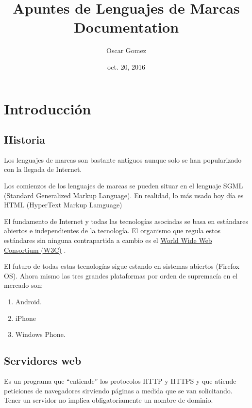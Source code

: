 \documentclass[letterpaper,10pt,spanish]{sphinxmanual}
\title{Apuntes de Lenguajes de Marcas Documentation}
\date{oct. 20, 2016}
\author{Oscar Gomez}
\begin{document}
\maketitle
\tableofcontents
{}\label{index::doc}



\chapter{Introducción}
\label{tema1::doc}\label{tema1:apuntes-de-lenguajes-de-marcas}\label{tema1:introduccion}

\section{Historia}
\label{tema1:historia}
Los lenguajes de marcas son bastante antiguos aunque solo se han popularizado con la llegada de Internet.

Los comienzos de los lenguajes de marcas se pueden situar en el lenguaje SGML (Standard Generalized Markup Language). En realidad, lo más usado hoy día es HTML (HyperText Markup Lamguage)

El fundamento de Internet y todas las tecnologías asociadas se basa en estándares abiertos e
independientes de la tecnología. El organismo que regula estos estándares sin ninguna contrapartida a cambio es el \href{http://www.w3c.org}{World Wide Web Consortium (W3C)} .

El futuro de todas estas tecnologías sigue estando en sistemas abiertos (Firefox OS). Ahora mismo las tres grandes plataformas por orden de supremacía en el mercado son:
\begin{enumerate}
\item {} 
Android.

\item {} 
iPhone

\item {} 
Windows Phone.

\end{enumerate}


\section{Servidores web}
\label{tema1:servidores-web}
Es un programa que “entiende” los protocolos HTTP y HTTPS y que atiende peticiones de navegadores
sirviendo páginas a medida que se van solicitando. Tener un servidor no implica obligatoriamente un nombre de dominio.
\end{document}
